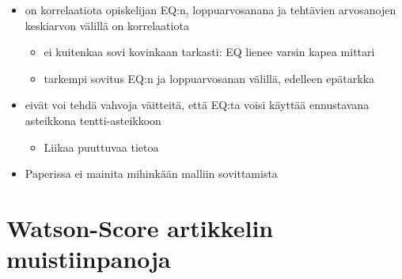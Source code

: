 \documentclass[finnish,twoside,openright]{HYgraduMLDS}
\begin{document}
\begin{itemize}
    \item on korrelaatiota opiskelijan EQ:n, loppuarvosanana ja tehtävien arvosanojen keskiarvon välillä on korrelaatiota
    \begin{itemize}
        \item ei kuitenkaa sovi kovinkaan tarkasti: EQ lienee varsin kapea mittari
        \item tarkempi sovitus EQ:n ja loppuarvosanan välillä, edelleen epätarkka
    \end{itemize}
    \item eivät voi tehdä vahvoja väitteitä, että EQ:ta voisi käyttää ennustavana asteikkona tentti-asteikkoon
    \begin{itemize}
        \item Liikaa puuttuvaa tietoa
    \end{itemize}
    \item Paperissa ei mainita mihinkään malliin sovittamista
\end{itemize}


\section{Watson-Score artikkelin muistiinpanoja\cite{watson2013predicting}}
\end{document}
